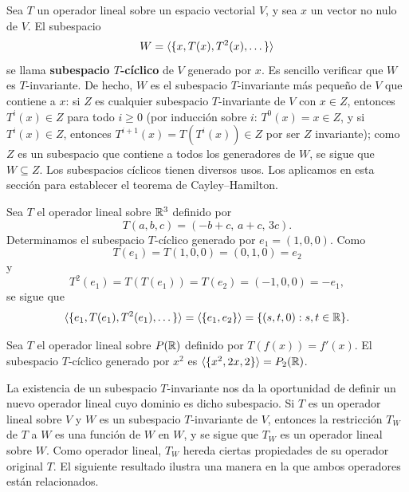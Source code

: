 \documentclass[12pt,a4paper]{book}
\begin{document}
    Sea $T$ un operador lineal sobre un espacio vectorial $V$, y sea $x$ un vector no nulo de $V$. El subespacio
    \begin{equation*}
        W=\langle \{x,T(x),T^2(x),\dots\} \rangle
    \end{equation*}
    se llama \textbf{subespacio $T$-cíclico} de $V$ generado por $x$. Es sencillo verificar que $W$ es $T$-invariante. De hecho, $W$ es el subespacio $T$-invariante más pequeño de $V$ que contiene a $x$: si $Z$ es cualquier subespacio $T$-invariante de $V$ con $x\in Z$, entonces $T^i(x)\in Z$ para todo $i\geq 0$ (por inducción sobre $i$: $T^0(x)=x\in Z$, y si $T^i(x)\in Z$, entonces $T^{i+1}(x)=T(T^i(x))\in Z$ por ser $Z$ invariante); como $Z$ es un subespacio que contiene a todos los generadores de $W$, se sigue que $W\subseteq Z$. Los subespacios cíclicos tienen diversos usos. Los aplicamos en esta sección para establecer el teorema de Cayley--Hamilton.

    \begin{ejemplo}
        Sea $T$ el operador lineal sobre $\mathbb{R}^3$ definido por
        \begin{equation*}
            T(a,b,c)=(-b+c,\,a+c,\,3c).
        \end{equation*}
        Determinamos el subespacio $T$-cíclico generado por $e_1=(1,0,0)$. Como
        \begin{equation*}
            T(e_1)=T(1,0,0)=(0,1,0)=e_2
        \end{equation*}
        y
        \begin{equation*}
            T^2(e_1)=T(T(e_1))=T(e_2)=(-1,0,0)=-e_1,
        \end{equation*}
        se sigue que
        \begin{equation*}
            \langle \{e_1,T(e_1),T^2(e_1),\dots\} \rangle=\langle \{e_1,e_2\} \rangle=\{(s,t,0):s,t\in\mathbb{R}\}.
        \end{equation*}
    \end{ejemplo}

    \begin{ejemplo}
        Sea $T$ el operador lineal sobre $P(\mathbb{R})$ definido por $T(f(x))=f'(x)$. El subespacio $T$-cíclico generado por $x^2$ es $\langle \{x^2,2x,2\} \rangle=P_2(\mathbb{R})$.
    \end{ejemplo}

    La existencia de un subespacio $T$-invariante nos da la oportunidad de definir un nuevo operador lineal cuyo dominio es dicho subespacio. Si $T$ es un operador lineal sobre $V$ y $W$ es un subespacio $T$-invariante de $V$, entonces la restricción $T_W$ de $T$ a $W$ es una función de $W$ en $W$, y se sigue que $T_W$ es un operador lineal sobre $W$. Como operador lineal, $T_W$ hereda ciertas propiedades de su operador original $T$. El siguiente resultado ilustra una manera en la que ambos operadores están relacionados.
\end{document}
